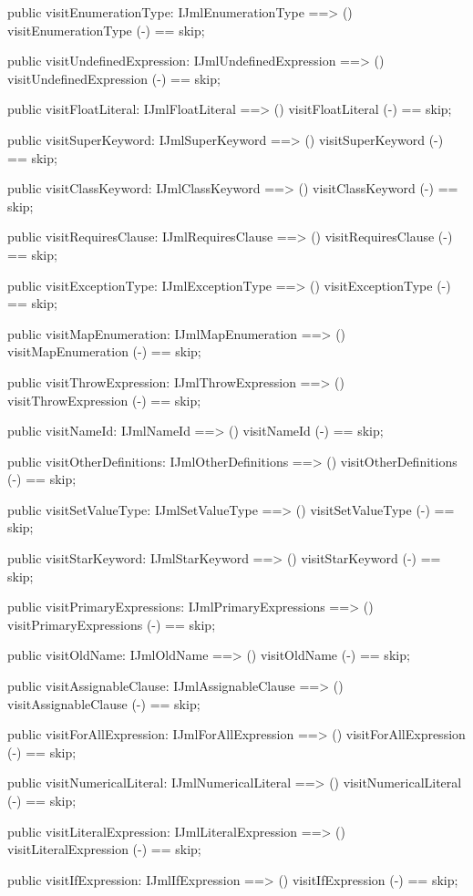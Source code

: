\begin{vdm_al}
  public visitEnumerationType: IJmlEnumerationType ==> ()
  visitEnumerationType (-) == skip;

  public visitUndefinedExpression: IJmlUndefinedExpression ==> ()
  visitUndefinedExpression (-) == skip;

  public visitFloatLiteral: IJmlFloatLiteral ==> ()
  visitFloatLiteral (-) == skip;

  public visitSuperKeyword: IJmlSuperKeyword ==> ()
  visitSuperKeyword (-) == skip;

  public visitClassKeyword: IJmlClassKeyword ==> ()
  visitClassKeyword (-) == skip;

  public visitRequiresClause: IJmlRequiresClause ==> ()
  visitRequiresClause (-) == skip;

  public visitExceptionType: IJmlExceptionType ==> ()
  visitExceptionType (-) == skip;

  public visitMapEnumeration: IJmlMapEnumeration ==> ()
  visitMapEnumeration (-) == skip;

  public visitThrowExpression: IJmlThrowExpression ==> ()
  visitThrowExpression (-) == skip;

  public visitNameId: IJmlNameId ==> ()
  visitNameId (-) == skip;

  public visitOtherDefinitions: IJmlOtherDefinitions ==> ()
  visitOtherDefinitions (-) == skip;

  public visitSetValueType: IJmlSetValueType ==> ()
  visitSetValueType (-) == skip;

  public visitStarKeyword: IJmlStarKeyword ==> ()
  visitStarKeyword (-) == skip;

  public visitPrimaryExpressions: IJmlPrimaryExpressions ==> ()
  visitPrimaryExpressions (-) == skip;

  public visitOldName: IJmlOldName ==> ()
  visitOldName (-) == skip;

  public visitAssignableClause: IJmlAssignableClause ==> ()
  visitAssignableClause (-) == skip;

  public visitForAllExpression: IJmlForAllExpression ==> ()
  visitForAllExpression (-) == skip;

  public visitNumericalLiteral: IJmlNumericalLiteral ==> ()
  visitNumericalLiteral (-) == skip;

  public visitLiteralExpression: IJmlLiteralExpression ==> ()
  visitLiteralExpression (-) == skip;

  public visitIfExpression: IJmlIfExpression ==> ()
  visitIfExpression (-) == skip;


\end{vdm_al}
